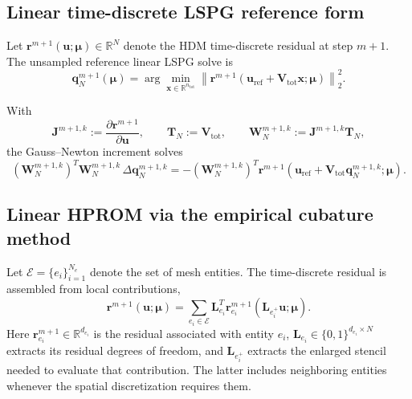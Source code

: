 \documentclass[11pt]{article}
\begin{document}
\subsection{Linear time-discrete LSPG reference form}
Let $\mathbf r^{m+1}(\mathbf u;\bm\mu)\in\mathbb R^N$ denote the HDM time-discrete residual at step $m{+}1$. The unsampled reference linear LSPG solve is
\begin{equation}
\mathbf q_N^{m+1}(\bm\mu)
=
\arg\min_{\mathbf x\in\mathbb R^{n_{\mathrm{tot}}}}
\left\|
\mathbf r^{m+1}\!\left(\mathbf u_{\mathrm{ref}}+\mathbf V_{\mathrm{tot}}\mathbf x;\bm\mu\right)
\right\|_2^2.
\label{eq:linear-lspg-min}
\end{equation}

With
\begin{equation}
\mathbf J^{m+1,k}:=\frac{\partial\mathbf r^{m+1}}{\partial\mathbf u},
\qquad
\mathbf T_N:=\mathbf V_{\mathrm{tot}},
\qquad
\mathbf W_N^{m+1,k}:=\mathbf J^{m+1,k}\mathbf T_N,
\end{equation}
the Gauss--Newton increment solves
\begin{equation}
(\mathbf W_N^{m+1,k})^T\mathbf W_N^{m+1,k}\,\Delta\mathbf q_N^{m+1,k}
=
-(\mathbf W_N^{m+1,k})^T
\mathbf r^{m+1}\!\left(\mathbf u_{\mathrm{ref}}+\mathbf V_{\mathrm{tot}}\mathbf q_N^{m+1,k};\bm\mu\right).
\label{eq:linear-gn-update}
\end{equation}

\subsection{Linear HPROM via the empirical cubature method}
Let $\mathcal E=\{e_i\}_{i=1}^{N_e}$ denote the set of mesh entities. The
time-discrete residual is assembled from local contributions,
\begin{equation}
\mathbf r^{m+1}(\mathbf u;\bm\mu)
=
\sum_{e_i\in\mathcal E}
\mathbf L_{e_i}^{T}
\mathbf r_{e_i}^{m+1}
\!\left(\mathbf L_{e_i^+}\mathbf u;\bm\mu\right).
\label{eq:elementwise-residual}
\end{equation}
Here $\mathbf r_{e_i}^{m+1}\in\mathbb R^{d_{e_i}}$ is the residual associated
with entity $e_i$, $\mathbf L_{e_i}\in\{0,1\}^{d_{e_i}\times N}$ extracts its
residual degrees of freedom, and $\mathbf L_{e_i^+}$ extracts the enlarged
stencil needed to evaluate that contribution.  The latter includes neighboring
entities whenever the spatial discretization requires them.
\end{document}
